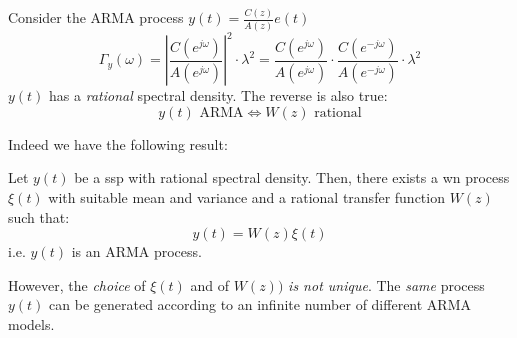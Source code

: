 \begin{exa}
Consider the ARMA process $y(t)=\frac{C(z)}{A(z)}e(t)$
\[
	\Gamma _{y}(\omega )=\left|\frac{C(e^{j\omega})}{A(e^{j\omega})}\right|^2 \cdot\lambda^2 =\frac{C(e^{j\omega})}{A(e^{j\omega} )} \cdot \frac{C(e^{-j\omega})}{A(e^{-j\omega} )}\cdot\lambda^2 
\]
$y(t)$ has a \emph{rational} spectral density. The reverse is also true:
\[
	y(t) \text{ ARMA} \iff W(z) \text{ rational}
\]
\end{exa}
Indeed we have the following result:
\begin{thm}
	Let $y(t)$ be a \gls{ssp} with rational spectral density.
	Then, there exists a \gls{wn} process $\xi(t)$ with suitable mean and variance and a rational transfer function $W(z)$ such that:
	\[
		y(t)=W(z)\xi(t)
	\]
	i.e. $y(t)$ is an ARMA process.
\end{thm}

However, the \emph{choice} of $\xi(t)$ and of $W(z))$ \emph{is not unique}.
The \emph{same} process $y(t)$ can be generated according to an infinite number of different ARMA models.

